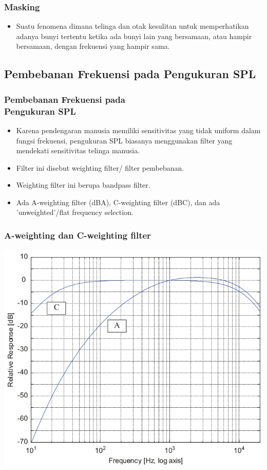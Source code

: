 \documentclass[pdflatex,compress]{beamer}
\begin{document}
\begin{frame}
	\frametitle{Masking}
	\begin{itemize}
		\item Suatu fenomena dimana telinga dan otak kesulitan untuk memperhatikan adanya bunyi tertentu ketika ada bunyi lain yang bersamaan, atau hampir bersamaan, dengan frekuensi yang hampir sama.
	\end{itemize}
\end{frame}

\subsection{Pembebanan Frekuensi pada Pengukuran SPL}

\begin{frame}
	\frametitle{Pembebanan Frekuensi pada\\Pengukuran SPL}
	\begin{itemize}
		\item Karena pendengaran manusia memiliki sensitivitas yang tidak uniform dalam fungsi frekuensi, pengukuran SPL biasanya menggunakan filter yang mendekati sensitivitas telinga manusia.
		\item Filter ini disebut weighting filter/ filter pembebanan.
		\item Weighting filter ini berupa bandpass filter.
		\item Ada A-weighting filter (dBA), C-weighting filter (dBC), dan ada 'unweighted'/flat frequency selection.
	\end{itemize}
\end{frame}

\begin{frame}
	\frametitle{A-weighting dan C-weighting filter}
	\begin{center}
		\includegraphics[width=0.6\linewidth]{img/img018}
	\end{center}
\end{frame}
\end{document}
